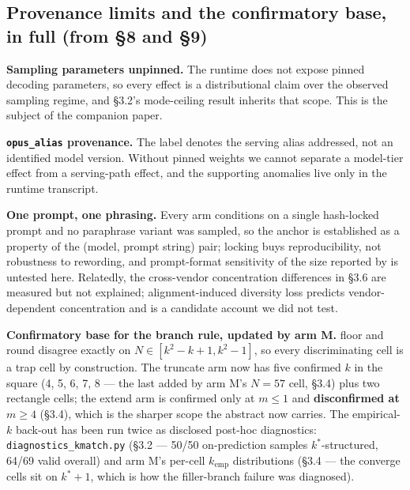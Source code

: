 \subsection{Provenance limits and the confirmatory base, in full (from \S8 and \S9)}

\textbf{Sampling parameters unpinned.} The runtime does not expose pinned decoding parameters, so
every effect is a distributional claim over the observed sampling regime, and \S3.2's mode-ceiling
result inherits that scope. This is the subject of the companion paper.

\textbf{\texttt{opus\_alias} provenance.} The label denotes the serving alias addressed, not an
identified model version. Without pinned weights we cannot separate a model-tier effect from a
serving-path effect, and the supporting anomalies live only in the runtime transcript.

\textbf{One prompt, one phrasing.} Every arm conditions on a single hash-locked prompt and no
paraphrase variant was sampled, so the anchor is established as a property of the (model, prompt
string) pair; locking buys reproducibility, not robustness to rewording, and prompt-format
sensitivity of the size reported by \citet{sclar2024formatspread} is untested here. Relatedly, the
cross-vendor concentration differences in \S3.6 are measured but not explained; alignment-induced
diversity loss \citep{kirk2024rlhf} predicts vendor-dependent concentration and is a candidate
account we did not test.

\textbf{Confirmatory base for the branch rule, updated by arm M.} floor and round disagree exactly
on $N \in [k^2-k+1, k^2-1]$, so every discriminating cell is a trap cell by construction. The
truncate arm now has five confirmed $k$ in the square (4, 5, 6, 7, 8 --- the last added by arm M's
$N = 57$ cell, \S3.4) plus two rectangle cells; the extend arm is confirmed only at $m \le 1$ and
\textbf{disconfirmed at $m \ge 4$} (\S3.4), which is the sharper scope the abstract now carries. The
empirical-$k$ back-out has been run twice as disclosed post-hoc diagnostics:
\texttt{diagnostics\_kmatch.py} (\S3.2 --- 50/50 on-prediction samples $k^*$-structured, 64/69 valid
overall) and arm M's per-cell $k_{\mathrm{emp}}$ distributions (\S3.4 --- the converge cells sit on
$k^*{+}1$, which is how the filler-branch failure was diagnosed).

